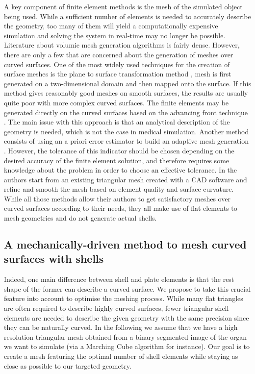 \documentclass{llncs}
\begin{document}
A key component of finite element methods is the mesh of the simulated object being used. While a sufficient number of elements is needed to accurately describe the geometry, too many of them will yield a computationally expensive simulation and solving the system in real-time may no longer be possible. Literature about volumic mesh generation algorithms is fairly dense. However, there are only a few that are concerned about the generation of meshes over curved surfaces. One of the most widely used techniques for the creation of surface meshes is the plane to surface transformation method \cite{Zienkiewicz71}, mesh is first generated on a two-dimensional domain and then mapped onto the surface. If this method gives reasonably good meshes on smooth surfaces, the results are usually quite poor with more complex curved surfaces. The finite elements may be generated directly on the curved surfaces based on the advancing front technique \cite{Lo85,Lau96}. The main issue with this approach is that an analytical description of the geometry is needed, which is not the case in medical simulation. Another method consists of using an a priori error estimator to build an adaptive mesh generation \cite{Baumann97}. However, the tolerance of this indicator should be chosen depending on the desired accuracy of the finite element solution, and therefore requires some knowledge about the problem in order to choose an effective tolerance. In \cite{Bechet02} the authors start from an existing triangular mesh created with a CAD software and refine and smooth the mesh based on element quality and surface curvature. While all those methods allow their authors to get satisfactory meshes over curved surfaces according to their needs, they all make use of flat elements to mesh geometries and do not generate actual shells. 

\subsection{A mechanically-driven method to mesh curved surfaces with shells}

Indeed, one main difference between shell and plate elements is that the rest shape of the former can describe a curved surface. We propose to take this crucial feature into account to optimise the meshing process. While many flat triangles are often required to describe highly curved surfaces, fewer triangular shell elements are needed to describe the given geometry with the same precision since they can be naturally curved. In the following we assume that we have a high resolution triangular mesh obtained from a binary segmented image of the organ we want to simulate (via a Marching Cube algorithm for instance). Our goal is to create a mesh featuring the optimal number of shell elements while staying as close as possible to our targeted geometry. 
\end{document}
